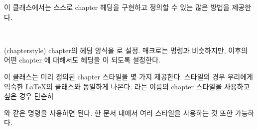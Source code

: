 
이 클래스에서는 스스로 chapter 헤딩을 구현하고 정의할 수 있는 많은 방법을 제공한다.

\begin{syntax}
\cmd{\chapterstyle} \\
\end{syntax}
\glossary(chapterstyle)%
  {}%
  {chapter의 헤딩 양식을 로 설정.}
\cmd{\chapterstyle} 매크로는 \cmd{\pagestyle} 명령과 비슷하지만,
이후의 어떤 chapter 에 대해서도 헤딩을 이 되도록 설정한다.

이 클래스는 미리 정의된 chapter 스타일을 몇 가지 제공한다.
 스타일의 경우 우리에게 익숙한 \LaTeX{}의  클래스와
동일하게 나온다.
 라는 이름의 chapter 스타일을 사용하고 싶은 경우 단순히

\begin{lcode}
\end{lcode}
와 같은 명령을 사용하면 된다. 한 문서 내에서 여러 스타일을 사용하는 것 또한 가능하다.

